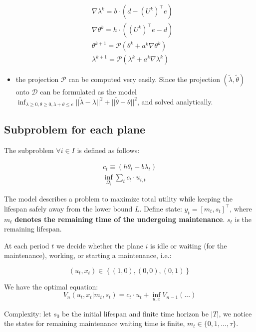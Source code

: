 \documentclass[
  a4paper,
,tablecaptionabove
]{scrartcl}
\numberwithin{equation}{section}
\providecommand{\tightlist}{%
  \setlength{\itemsep}{0pt}\setlength{\parskip}{0pt}}
\begin{document}
\[\begin{aligned}
  &\nabla \lambda^k = b\cdot \left(d -  (U^k)^\top e\right) \\
  &\nabla \theta^k = h\cdot \left((U^k)^\top e - d\right) \\
  &\theta^{k+1} = \mathcal P (\theta^k + a^k\nabla\theta^k ) \\
  &\lambda^{k+1} = \mathcal P (\lambda^k + a^k\nabla\lambda^k )
\end{aligned}\]

\begin{itemize}
\tightlist
\item
  the projection \(\mathcal P\) can be computed very easily. Since the
  projection \((\tilde\lambda, \tilde\theta)\) onto \(\mathcal D\) can
  be formulated as the model
  \(\inf_{\lambda\ge 0, \theta \ge 0, \lambda + \theta \le e} ||\tilde\lambda-\lambda||^2 + ||\tilde\theta - \theta||^2\),
  and solved analytically.
\end{itemize}

\hypertarget{subproblem-for-each-plane}{%
\subsection{Subproblem for each plane}\label{subproblem-for-each-plane}}

The subproblem \(\forall i\in I\) is defined as follows:

\[\begin{aligned}
c_t \equiv (h\theta_t - b\lambda_t) \\
\inf_{\Omega_i} \sum_t c_t \cdot u_{i,t}
\end{aligned}\]

The model describes a problem to maximize total utility while keeping
the lifespan safely away from the lower bound \(L\). Define state:
\(y_t = \left[m_t,s_t \right]^\top\), where \(m_t\) \textbf{denotes the
remaining time of the undergoing maintenance}. \(s_t\) is the remaining
lifespan.

At each period \(t\) we decide whether the plane \(i\) is idle or
waiting (for the maintenance), working, or starting a maintenance, i.e.:

\[(u_t, x_t) \in \left\{(1, 0), (0,0), (0, 1)\right\}\]

We have the optimal equation:
\[V_n(u_t, x_t | m_t, s_t) = c_t \cdot u_t + \inf_{u,x} V_{n-1}(...)\]

Complexity: let \(s_0\) be the initial lifespan and finite time horizon
be \(|T|\), we notice the states for remaining maintenance waiting time
is finite, \(m_t \in \{0, 1, ..., \tau\}\).
\end{document}
